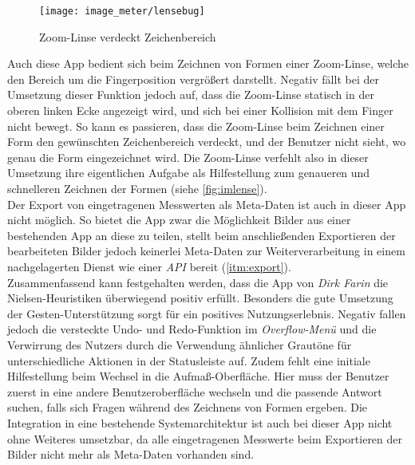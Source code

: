 \begin{wrapfigure}{R}{0.5\textwidth}
  \centering
  \texttt{[image: image\_meter/lensebug]}
  \caption{Zoom-Linse verdeckt Zeichenbereich}
  \label{fig:imlense}
\end{wrapfigure}

Auch diese App bedient sich beim Zeichnen von Formen einer Zoom-Linse, welche den Bereich um die Fingerposition vergrößert darstellt.
Negativ fällt bei der Umsetzung dieser Funktion jedoch auf, dass die Zoom-Linse statisch in der oberen linken Ecke angezeigt wird, und sich bei einer Kollision mit dem Finger nicht bewegt.
So kann es passieren, dass die Zoom-Linse beim Zeichnen einer Form den gewünschten Zeichenbereich verdeckt, und der Benutzer nicht sieht, wo genau die Form eingezeichnet wird.
Die Zoom-Linse verfehlt also in dieser Umsetzung ihre eigentlichen Aufgabe als Hilfestellung zum genaueren und schnelleren Zeichnen der Formen (siehe \autoref{fig:imlense}). \\

Der Export von eingetragenen Messwerten als Meta-Daten ist auch in dieser App nicht möglich.
So bietet die App zwar die Möglichkeit Bilder aus einer bestehenden App an diese zu teilen, stellt beim anschließenden Exportieren der bearbeiteten Bilder jedoch keinerlei Meta-Daten zur Weiterverarbeitung in einem nachgelagerten Dienst wie einer \emph{API} bereit (\autoref{itm:export}). \\

Zusammenfassend kann festgehalten werden, dass die App \im{} von \emph{Dirk Farin} die Nielsen-Heuristiken überwiegend positiv erfüllt.
Besonders die gute Umsetzung der Gesten-Unterstützung sorgt für ein positives Nutzungserlebnis.
Negativ fallen jedoch die versteckte Undo- und Redo-Funktion im \emph{Overflow-Menü} und die Verwirrung des Nutzers durch die Verwendung ähnlicher Grautöne für unterschiedliche Aktionen in der Statusleiste auf.
Zudem fehlt eine initiale Hilfestellung beim Wechsel in die Aufmaß-Oberfläche.
Hier muss der Benutzer zuerst in eine andere Benutzeroberfläche wechseln und die passende Antwort suchen, falls sich Fragen während des Zeichnens von Formen ergeben.
Die Integration in eine bestehende Systemarchitektur ist auch bei dieser App nicht ohne Weiteres umsetzbar, da alle eingetragenen Messwerte beim Exportieren der Bilder nicht mehr als Meta-Daten vorhanden sind.
